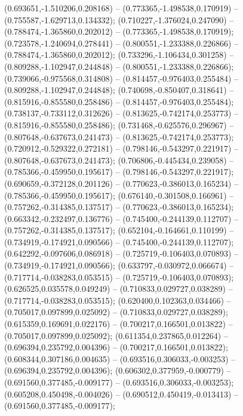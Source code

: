  (0.693651,-1.510206,0.208168) -- (0.773365,-1.498538,0.170919) -- (0.755587,-1.629713,0.134332);
 (0.710227,-1.376024,0.247090) -- (0.788474,-1.365860,0.202012) -- (0.773365,-1.498538,0.170919);
 (0.723578,-1.240694,0.278441) -- (0.800551,-1.233388,0.226866) -- (0.788474,-1.365860,0.202012);
 (0.733296,-1.106434,0.301258) -- (0.809288,-1.102947,0.244848) -- (0.800551,-1.233388,0.226866);
 (0.739066,-0.975568,0.314808) -- (0.814457,-0.976403,0.255484) -- (0.809288,-1.102947,0.244848);
 (0.740698,-0.850407,0.318641) -- (0.815916,-0.855580,0.258486) -- (0.814457,-0.976403,0.255484);
 (0.738137,-0.733112,0.312626) -- (0.813625,-0.742174,0.253773) -- (0.815916,-0.855580,0.258486);
 (0.731468,-0.625576,0.296967) -- (0.807648,-0.637673,0.241473) -- (0.813625,-0.742174,0.253773);
 (0.720912,-0.529322,0.272181) -- (0.798146,-0.543297,0.221917) -- (0.807648,-0.637673,0.241473);
 (0.706806,-0.445434,0.239058) -- (0.785366,-0.459950,0.195617) -- (0.798146,-0.543297,0.221917);
 (0.690659,-0.372128,0.201126) -- (0.770623,-0.386013,0.165234) -- (0.785366,-0.459950,0.195617);
 (0.676140,-0.301508,0.166961) -- (0.757262,-0.314385,0.137517) -- (0.770623,-0.386013,0.165234);
 (0.663342,-0.232497,0.136776) -- (0.745400,-0.244139,0.112707) -- (0.757262,-0.314385,0.137517);
 (0.652104,-0.164661,0.110199) -- (0.734919,-0.174921,0.090566) -- (0.745400,-0.244139,0.112707);
 (0.642292,-0.097606,0.086918) -- (0.725719,-0.106403,0.070893) -- (0.734919,-0.174921,0.090566);
 (0.633797,-0.030972,0.066674) -- (0.717714,-0.038283,0.053515) -- (0.725719,-0.106403,0.070893);
 (0.626525,0.035578,0.049249) -- (0.710833,0.029727,0.038289) -- (0.717714,-0.038283,0.053515);
 (0.620400,0.102363,0.034466) -- (0.705017,0.097899,0.025092) -- (0.710833,0.029727,0.038289);
 (0.615359,0.169691,0.022176) -- (0.700217,0.166501,0.013822) -- (0.705017,0.097899,0.025092);
 (0.611354,0.237865,0.012264) -- (0.696394,0.235792,0.004396) -- (0.700217,0.166501,0.013822);
 (0.608344,0.307186,0.004635) -- (0.693516,0.306033,-0.003253) -- (0.696394,0.235792,0.004396);
 (0.606302,0.377959,-0.000779) -- (0.691560,0.377485,-0.009177) -- (0.693516,0.306033,-0.003253);
 (0.605208,0.450498,-0.004026) -- (0.690512,0.450419,-0.013413) -- (0.691560,0.377485,-0.009177);

